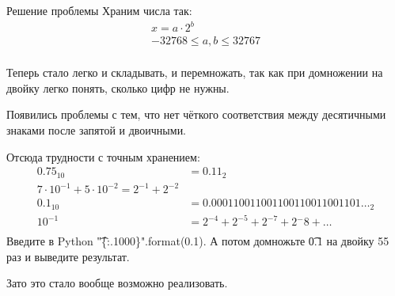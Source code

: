 \begin{frame}{Решение проблемы}
	Храним числа так:
	\begin{gather*}
		x = a \cdot 2^b \\
		-32768 \le a, b \le 32767 \\
	\end{gather*}

	Теперь стало легко и складывать, и перемножать, так как при домножении на двойку легко понять, сколько цифр не нужны.

	Появились проблемы с тем, что нет чёткого соответствия между десятичными знаками после запятой и двоичными.

	Отсюда трудности с точным хранением:
	\begin{align*}
		0.75_{10} &= {0.11}_{2} \\
		7 \cdot 10^{-1} + 5 \cdot 10^{-2} = 2^{-1} + 2^{-2} \\
		0.1_{10} &= {0.000110011001100110011001101\dots}_{2} \\
		10^{-1} &= 2^{-4} + 2^{-5} + 2^{-7} + 2{^-8} + \dots \\
	\end{align*}
	Введите в Python \t{"\{:.1000\}".format(0.1)}.
	А потом домножьте \t{0.1} на двойку 55 раз и выведите результат.

	Зато это стало вообще возможно реализовать.
\end{frame}
